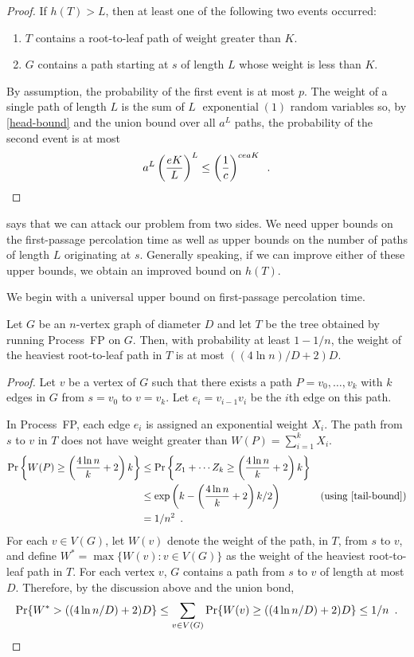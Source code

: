 \documentclass[lotsofwhite]{patmorin}
\DeclareMathOperator{\exponential}{exponential}
\begin{document}
\begin{proof}
   If $h(T)> L$, then at least one of the following two events occurred:
   \begin{enumerate}
     \item $T$ contains a root-to-leaf path of weight greater than $K$.
     \item $G$ contains a path starting at $s$ of length $L$ whose weight 
        is less than $K$.
   \end{enumerate}
   By assumption, the probability of the first event is at most $p$.  
   The weight of a single path of length $L$ is the sum of $L$ $\exponential(1)$
   random variables so, by \eqref{head-bound} and the union bound over
   all $a^L$ paths, the probability of the second event is at most
   \[
       a^L \left(\frac{eK}{L} \right)^L \le \left(\frac{1}{c}\right)^{ceaK}
       \enspace . \qedhere
   \]
\end{proof}

 says that we can attack our problem from two
sides. We need upper bounds on the first-passage percolation time as well
as upper bounds on the number of paths of length $L$ originating at $s$.
Generally speaking, if we can improve either of these upper bounds,
we obtain an improved bound on $h(T)$.

We begin with a universal upper bound on first-passage percolation time.

\begin{lem}
  Let $G$ be an $n$-vertex graph of diameter $D$ and let $T$ be the
  tree obtained by running Process~FP on $G$.  Then, with probability
  at least $1-1/n$, the weight of the heaviest root-to-leaf path in $T$
  is at most $((4\ln n)/D+2)D$.
\end{lem}

\begin{proof}
  Let $v$ be a vertex of $G$ such that there exists a path
  $P=v_0,\ldots,v_k$ with $k$ edges in $G$ from $s=v_0$ to $v=v_k$.
  Let $e_i=v_{i-1}v_i$ be the $i$th edge on this path.

  In Process~FP, each edge $e_i$ is assigned an exponential weight $X_i$.
  The path from $s$ to $v$ in $T$ does not have weight greater than
  $W(P)=\sum_{i=1}^k X_i$.
  \begin{align*}
      \Pr\left\{W(P)\ge \left(\frac{4\ln n}{k}+2\right)k\right\} 
        & \le \Pr\left\{Z_1+\cdots Z_k\ge \left(\frac{4\ln n}{k}+2\right)k\right\} \\ 
        & \le \exp\left(k - \left(\frac{4\ln n}{k}+2\right)k/2\right) 
            & \text{(using \eqref{tail-bound})} \\
      & = 1/n^2 \enspace .
  \end{align*}
  For each $v\in V(G)$, let $W(v)$ denote the weight of the path, in
  $T$, from $s$ to $v$, and define $W^*=\max\{W(v):v\in V(G)\}$  as the
  weight of the heaviest root-to-leaf path in $T$.  For each vertex $v$,
  $G$ contains a path from $s$ to $v$ of length at most $D$. Therefore,
  by the discussion above and the union bond,
  \[
      \Pr\{W^*> ((4\ln n/D)+2)D\} 
          \le \sum_{v\in V(G)}\Pr\{W(v) \ge ((4\ln n/D)+2)D\}     
       \le 1/n \enspace . \qedhere
  \]
\end{proof}
\end{document}
